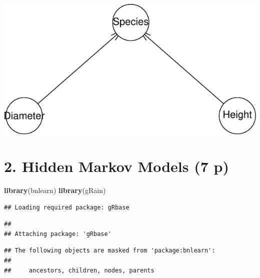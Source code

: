 \documentclass[
]{article}
\newenvironment{Shaded}{\begin{snugshade}}{\end{snugshade}}
\newcommand{\FunctionTok}[1]{\textcolor[rgb]{0.13,0.29,0.53}{\textbf{#1}}}
\newcommand{\NormalTok}[1]{#1}
\begin{document}
\includegraphics{jan2021_files/figure-latex/unnamed-chunk-1-3.pdf}

\section{2. Hidden Markov Models (7 p)}\label{hidden-markov-models-7-p}

\begin{Shaded}
\begin{Highlighting}[]
\FunctionTok{library}\NormalTok{(bnlearn)}
\FunctionTok{library}\NormalTok{(gRain)}
\end{Highlighting}
\end{Shaded}

\begin{verbatim}
## Loading required package: gRbase
\end{verbatim}

\begin{verbatim}
## 
## Attaching package: 'gRbase'
\end{verbatim}

\begin{verbatim}
## The following objects are masked from 'package:bnlearn':
## 
##     ancestors, children, nodes, parents
\end{verbatim}
\end{document}
